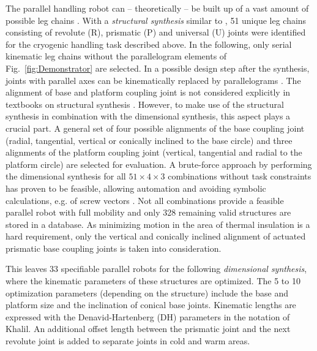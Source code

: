 \documentclass{svproc}
\begin{document}
The parallel handling robot can -- theoretically -- be built up of a vast amount of possible leg chains \cite{Gogu2008,KongGos2007}.
With a \emph{structural synthesis} similar to \cite{Gogu2008}, 51 unique leg chains consisting of revolute (R), prismatic (P) and universal (U) joints were identified for the cryogenic handling task described above.
In the following, only serial kinematic leg chains without the  parallelogram elements of Fig.~\ref{fig:Demonstrator} are selected.
In a possible design step after the synthesis, joints with parallel axes can be kinematically replaced by parallelograms \cite{FrindtKreHes2010}.
The alignment of base and platform coupling joint is not considered explicitly in textbooks on structural synthesis \cite{Gogu2008,KongGos2007}.
However, to make use of the structural synthesis in combination with the dimensional synthesis, this aspect plays a crucial part.
A general set of four possible alignments of the base coupling joint (radial, tangential, vertical or conically inclined to the base circle) and three alignments of the platform coupling joint (vertical, tangential and radial to the platform circle) are selected for evaluation.
A brute-force approach by performing the dimensional synthesis for all $51\times4\times3$ combinations without task constraints has proven to be feasible, allowing automation and avoiding symbolic calculations, e.g. of screw vectors \cite{KongGos2007}.
Not all combinations provide a feasible parallel robot with full mobility and only 328 remaining valid structures are stored in a database.
As minimizing motion in the area of thermal insulation is a hard requirement, only the vertical and conically inclined alignment of actuated prismatic base coupling joints is taken into consideration.

This leaves 33 specifiable parallel robots for the following \emph{dimensional synthesis}, where the kinematic parameters of these structures are optimized.
The 5 to 10 optimization parameters (depending on the structure) include the base and platform size and the inclination of conical base joints. 
Kinematic lengths are expressed with the Denavid-Hartenberg (DH) parameters in the notation of Khalil.
An additional offset length between the prismatic joint and the next revolute joint is added to separate joints in cold and warm areas.
\end{document}
